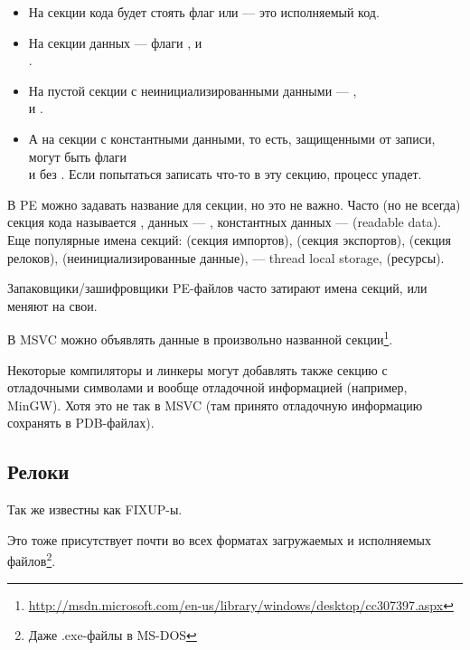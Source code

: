 \begin{itemize}
\item
На секции кода будет стоять флаг  или  --- это исполняемый код. 

\item
На секции данных --- флаги ,  и \\
.

\item
На пустой секции с неинициализированными данными --- , \\
 и .

\item
А на секции с константными данными, то есть, защищенными от записи, могут быть флаги \\
 и  без . 
Если попытаться записать что-то в эту секцию, процесс упадет.
\end{itemize}

В PE можно задавать название для секции, но это не важно.
Часто (но не всегда) секция кода называется , данных --- , константных данных ---  (readable data).
Еще популярные имена секций:  (секция импортов),  (секция экспортов),  (секция релоков),  (неинициализированные данные),  --- thread local storage,  (ресурсы).

Запаковщики/зашифровщики PE-файлов часто затирают имена секций, или меняют на свои.

В MSVC можно объявлять данные в произвольно названной секции\footnote{\url{http://msdn.microsoft.com/en-us/library/windows/desktop/cc307397.aspx}}.

Некоторые компиляторы и линкеры могут добавлять также секцию с отладочными символами и вообще отладочной информацией
(например, MinGW).
Хотя это не так в \ac{MSVC} (там принято отладочную информацию сохранять в PDB-файлах).

\subsection{Релоки}

Так же известны как FIXUP-ы.

Это тоже присутствует почти во всех форматах загружаемых и исполняемых файлов\footnote{Даже .exe-файлы в MS-DOS}.


